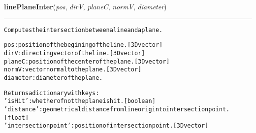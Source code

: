     \vspace{0.5ex}

\hspace{.8\funcindent}\begin{boxedminipage}{\funcwidth}

    \raggedright \textbf{linePlaneInter}(\textit{pos}, \textit{dirV}, \textit{planeC}, \textit{normV}, \textit{diameter})

    \vspace{-1.5ex}

    \rule{\textwidth}{0.5\fboxrule}
\setlength{\parskip}{2ex}
\begin{alltt}
Computes the intersection between a line and a plane.

pos: position of the begining of the line. [3D vector]
dirV: directing vector of the line. [3D vector]
planeC: position of the center of the plane. [3D vector]
normV: vector normal to the plane. [3D vector]
diameter: diameter of the plane.

Returns a dictionary with keys:
    'isHit': whether of not the plane is hit. [boolean]
    'distance': geometrical distance from line origin to intersection point.
        [float]
    'intersection point': position of intersection point. [3D vector]
\end{alltt}

\setlength{\parskip}{1ex}
    \end{boxedminipage}

    \label{theia:helpers:geometry:lineSurfInter}

    \vspace{0.5ex}

